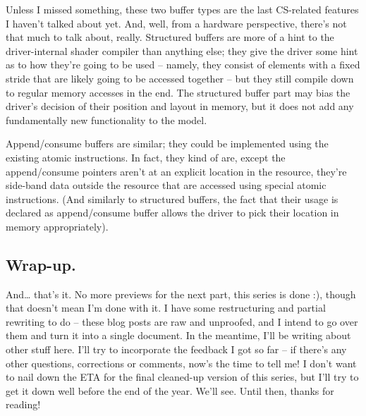 \documentclass[12pt]{article}
\begin{document}
Unless I missed something, these two buffer types are the last CS-related features I haven’t talked about yet. And, well, from a hardware perspective, there’s not that much to talk about, really. Structured buffers are more of a hint to the driver-internal shader compiler than anything else; they give the driver some hint as to how they’re going to be used – namely, they consist of elements with a fixed stride that are likely going to be accessed together – but they still compile down to regular memory accesses in the end. The structured buffer part may bias the driver’s decision of their position and layout in memory, but it does not add any fundamentally new functionality to the model.

Append/consume buffers are similar; they could be implemented using the existing atomic instructions. In fact, they kind of are, except the append/consume pointers aren’t at an explicit location in the resource, they’re side-band data outside the resource that are accessed using special atomic instructions. (And similarly to structured buffers, the fact that their usage is declared as append/consume buffer allows the driver to pick their location in memory appropriately).

\subsection{Wrap-up.}
\label{sec:orgdcce2c3}

And… that’s it. No more previews for the next part, this series is done :), though that doesn’t mean I’m done with it. I have some restructuring and partial rewriting to do – these blog posts are raw and unproofed, and I intend to go over them and turn it into a single document. In the meantime, I’ll be writing about other stuff here. I’ll try to incorporate the feedback I got so far – if there’s any other questions, corrections or comments, now’s the time to tell me! I don’t want to nail down the ETA for the final cleaned-up version of this series, but I’ll try to get it down well before the end of the year. We’ll see. Until then, thanks for reading!
\end{document}
